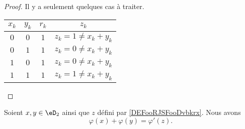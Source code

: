 \begin{proof}
	Il y a seulement quelques cas à traiter.
	\begin{center}
		\begin{tabular}{c|c|c|c}
			\( x_k\) & \( y_k\) & \( r_k\) & \( z_k\)               \\
			\hline
			\( 0\)   & \( 0\)   & \( 1\)   & \( z_k=1\neq x_k+y_k\) \\
			\hline
			\( 0\)   & \( 1\)   & \( 1\)   & \( z_k=0\neq x_k+y_k\) \\
			\hline
			\( 1\)   & \( 0\)   & \( 1\)   & \( z_k=0\neq x_k+y_k\) \\
			\hline
			\( 1\)   & \( 1\)   & \( 1\)   & \( z_k=1\neq x_k+y_k\) \\
		\end{tabular}
	\end{center}
\end{proof}


\begin{proposition}	\label{PROPooGHPZooEwXqMH}
	Soient \( x,y\in \eD_2\) ainsi que \( z\) défini par \ref{DEFooRJSFooDvbkrx}. Nous avons
	\begin{equation}
		\varphi(x)+\varphi(y)=\varphi'(z).
	\end{equation}
\end{proposition}

